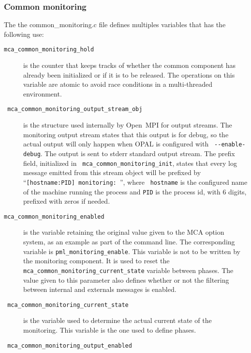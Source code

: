 \documentclass[notitlepage]{article}
\newcommand{\ompi}[0]{Open~MPI}
\newcommand{\brkunds}[0]{\allowbreak\_}
\begin{document}
\subsubsection{Common monitoring}
\label{subsubsec:TDI-common-monitoring}

The the common\brkunds{}monitoring.c file defines multiples variables
that has the following use:
\begin{description}
\item[{\tt mca\brkunds{}common\brkunds{}monitoring\brkunds{}hold}] is
  the counter that keeps tracks of whether the common component has
  already been initialized or if it is to be released. The operations
  on this variable are atomic to avoid race conditions in a
  multi-threaded environment.
\item[{\tt
    mca\brkunds{}common\brkunds{}monitoring\brkunds{}output\brkunds{}stream\brkunds{}obj}]
  is the structure used internally by \ompi{} for output streams. The
  monitoring output stream states that this output is for debug, so
  the actual output will only happen when OPAL is configured with {\tt
    -{}-enable-debug}. The output is sent to stderr standard output
  stream. The prefix field, initialized in {\tt
    mca\brkunds{}common\brkunds{}monitoring\brkunds{}init}, states
  that every log message emitted from this stream object will be
  prefixed by ``{\tt [hostname:PID] monitoring: }'', where {\tt
    hostname} is the configured name of the machine running the
  process and {\tt PID} is the process id, with 6 digits, prefixed
  with zeros if needed.
\item[{\tt mca\brkunds{}common\brkunds{}monitoring\brkunds{}enabled}]
  is the variable retaining the original value given to the MCA option
  system, as an example as part of the command line. The corresponding
  variable is {\tt pml\brkunds{}monitoring\brkunds{}enable}. This
  variable is not to be written by the monitoring component. It is
  used to reset the {\tt
    mca\brkunds{}common\brkunds{}monitoring\brkunds{}current\brkunds{}state}
  variable between phases. The value given to this parameter also
  defines whether or not the filtering between internal and externals
  messages is enabled.
\item[{\tt
    mca\brkunds{}common\brkunds{}monitoring\brkunds{}current\brkunds{}state}]
  is the variable used to determine the actual current state of the
  monitoring. This variable is the one used to define phases.
\item[{\tt
    mca\brkunds{}common\brkunds{}monitoring\brkunds{}output\brkunds{}enabled}]

\end{description}
\end{document}
